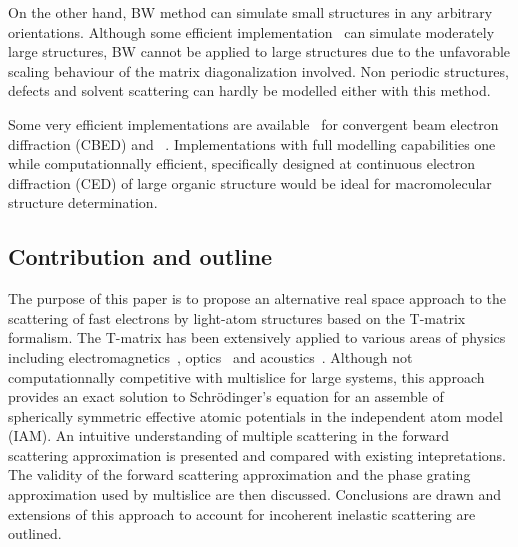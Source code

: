 On the other hand, BW method can simulate small structures in any arbitrary
orientations. Although some efficient implementation~\cite{Zuo1995} can simulate
moderately large structures, BW cannot be applied to large structures due to
the unfavorable scaling behaviour of the matrix diagonalization involved.
Non periodic structures, defects and solvent scattering can hardly be modelled
either with this method.

Some very efficient implementations are available~\cite{Ophus2017} for convergent beam
electron diffraction (CBED) and ~\cite{Allen2015}.
Implementations with full modelling capabilities one while computationnally efficient,
specifically designed at continuous electron diffraction (CED) of large organic
structure would be ideal for macromolecular structure determination.



\subsection{Contribution and outline}

The purpose of this paper is to propose an alternative real space approach
to the scattering of fast electrons by light-atom structures based on
the T-matrix formalism.
The T-matrix has been extensively applied to various areas of physics including
electromagnetics~\cite{Hamid1990,Hamid1990_b,Eremin1995}, optics~\cite{Moine2005}
and acoustics~\cite{Silva2012,Godin2011}.
Although not computationnally competitive with multislice
for large systems, this approach provides an exact solution to Schr{\"o}dinger's
equation for an assemble of spherically symmetric effective atomic potentials in
the independent atom model (IAM).
An intuitive understanding of multiple scattering in the forward scattering
approximation is presented and compared with existing intepretations.
The validity of the forward scattering approximation and the phase grating
approximation used by multislice are then discussed.
Conclusions are drawn and extensions of this approach to account for incoherent
inelastic scattering are outlined.





